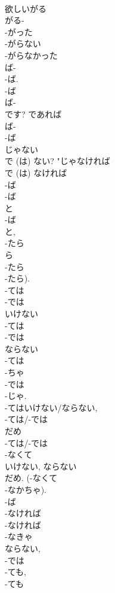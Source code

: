 \documentclass[8pt]{extreport}
\begin{document}
\begin{CJK}{UTF8}{min}
\\	欲しいがる 
\\	がる-
\\	-がった
\\	-がらない
\\	-がらなかった
\\	ば-
\\	-ば.
\\	-ば 
\\	ば-
\\	です?	であれば	
\\	ば-
\\	-ば 
\\	じゃない 
\\	で (は) ない?	"じゃなければ 
\\	で (は) なければ 
\\	-ば 
\\	-ば 
\\	と	
\\	-ば 
\\	と, 
\\	-たら 
\\	ら 
\\	-たら 
\\	-たら).	
\\	-ては 
\\	-では 
\\	いけない
\\	-ては 
\\	-では 
\\	ならない 
\\	-ては 
\\	-ちゃ 
\\	-では 
\\	-じゃ.
\\	-てはいけない/ならない, 
\\	-ては/-では 
\\	だめ	
\\	-ては/-では 
\\	-なくて 
\\	いけない, ならない 
\\	だめ. (-なくて 
\\	-なかちゃ). 
\\	-ば 
\\	-なければ 
\\	-なければ 
\\	-なきゃ 
\\	ならない, 
\\	-では 
\\	-ても, 
\\	-ても 

\end{CJK}
\end{document}
